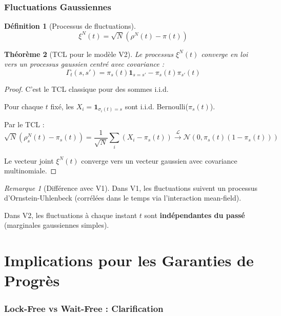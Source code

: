 \documentclass[11pt,a4paper]{article}
\theoremstyle{plain}
\newtheorem{theorem}{Théorème}[section]
\theoremstyle{definition}
\newtheorem{definition}[theorem]{Définition}
\theoremstyle{remark}
\newtheorem*{remark}{Remarque}
\newcommand{\ind}{\mathbf{1}}
\newcommand{\calL}{\mathcal{L}}
\begin{document}
\section{Fluctuations Gaussiennes}

\begin{definition}[Processus de fluctuations]
\[
\xi^N(t) = \sqrt{N} \left( \rho^N(t) - \pi(t) \right)
\]
\end{definition}

\begin{theorem}[TCL pour le modèle V2]\label{thm:clt_v2}
Le processus $\xi^N(t)$ converge en loi vers un processus gaussien centré avec covariance :
\[
\Gamma_t(s, s') = \pi_s(t) \ind_{s=s'} - \pi_s(t) \pi_{s'}(t)
\]
\end{theorem}

\begin{proof}
C'est le TCL classique pour des sommes i.i.d.

Pour chaque $t$ fixé, les $X_i = \ind_{\sigma_i(t) = s}$ sont i.i.d. Bernoulli($\pi_s(t)$).

Par le TCL :
\[
\sqrt{N}(\rho^N_s(t) - \pi_s(t)) = \frac{1}{\sqrt{N}} \sum_i (X_i - \pi_s(t)) \xrightarrow{\calL} \mathcal{N}(0, \pi_s(t)(1 - \pi_s(t)))
\]

Le vecteur joint $\xi^N(t)$ converge vers un vecteur gaussien avec covariance multinomiale.
\end{proof}

\begin{remark}[Différence avec V1]
Dans V1, les fluctuations suivent un processus d'Ornstein-Uhlenbeck (corrélées dans le temps via l'interaction mean-field).

Dans V2, les fluctuations à chaque instant $t$ sont \textbf{indépendantes du passé} (marginales gaussiennes simples).
\end{remark}

\part{Implications pour les Garanties de Progrès}

\section{Lock-Free vs Wait-Free : Clarification}
\end{document}
